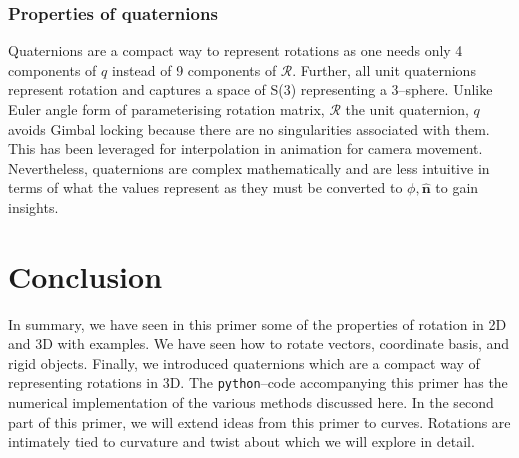\documentclass{article}
\def\nh{\hat{\mathbf{n}}}
\def\R{\mathcal{R}}
\def\nh{\hat{\mathbf{n}}}
\begin{document}
\subsubsection*{Properties of quaternions}
Quaternions are a compact way to represent rotations as one needs only 4 components of $q$ instead of 9 components of $\R$. Further, all unit quaternions represent rotation and captures a space of S(3) representing a 3--sphere. Unlike Euler angle form of parameterising rotation matrix, $\R$ the unit quaternion, $q$ avoids Gimbal locking because there are no singularities associated with them. This has been leveraged for interpolation in animation for camera movement. Nevertheless, quaternions are complex mathematically and are less intuitive in terms of what the values represent as they must be converted to $\phi, \nh$ to gain insights.

\section{Conclusion}

In summary, we have seen in this primer some of the properties of rotation in 2D and 3D with examples. We have seen how to rotate vectors, coordinate basis, and rigid objects. Finally, we introduced quaternions which are a compact way of representing rotations in 3D. The \texttt{python}--code accompanying this primer has the numerical implementation of the various methods discussed here. In the second part of this primer, we will extend ideas from this primer to curves. Rotations are intimately tied to curvature and twist about which we will explore in detail.



\end{document}
